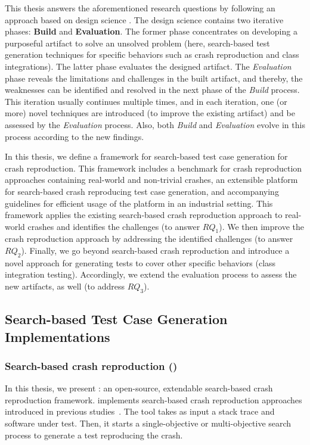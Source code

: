 This thesis answers the aforementioned research questions by following an approach based on design science \cite{Hevner2004}.
The design science contains two iterative phases: \textbf{Build} and \textbf{Evaluation}. The former phase concentrates on developing a purposeful artifact to solve an unsolved problem (here, search-based test generation techniques for specific behaviors such as crash reproduction and class integrations). The latter phase evaluates the designed artifact.
The \textit{Evaluation} phase reveals the limitations and challenges in the built artifact, and thereby, the weaknesses can be identified and resolved in the next phase of the \textit{Build} process. This iteration usually continues multiple times, and in each iteration, one (or more) novel techniques are introduced (to improve the existing artifact) and be assessed by the \textit{Evaluation} process. Also, both \textit{Build} and \textit{Evaluation} evolve in this process according to the new findings. 

In this thesis, we define a framework for search-based test case generation for crash reproduction. This framework includes a benchmark for crash reproduction approaches containing real-world and non-trivial crashes, an extensible platform for search-based crash reproducing test case generation, and accompanying guidelines for efficient usage of the platform in an industrial setting. This framework applies the existing search-based crash reproduction approach to real-world crashes and identifies the challenges (to answer $RQ_1$). We then improve the crash reproduction approach by addressing the identified challenges (to answer $RQ_2$). Finally, we go beyond search-based crash reproduction and introduce a novel approach for generating tests to cover other specific behaviors (\eg class integration testing). Accordingly, we extend the evaluation process to assess the new artifacts, as well (to address $RQ_3$).

\subsection{Search-based Test Case Generation Implementations}
\subsubsection{Search-based crash reproduction (\botsing)}
In this thesis, we present \botsing: an open-source, extendable search-based crash reproduction framework. \botsing implements search-based crash reproduction approaches introduced in previous studies~\cite{Rossler2013, Soltani2018a, Soltani2018b}. The tool takes as input a stack trace and software under test. Then, it starts a single-objective or multi-objective search process to generate a test reproducing the crash.


